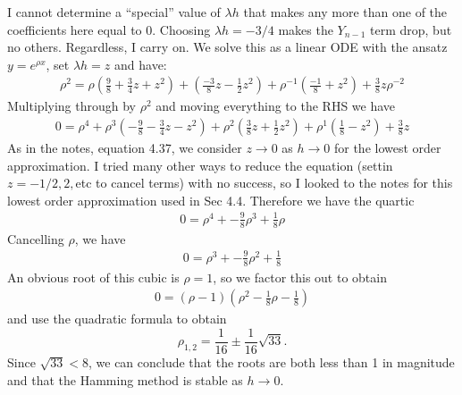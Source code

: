 \documentclass[11pt]{article}
\def\f{\frac }
\begin{document}
\begin{enumerate}
\begin{enumerate}
I cannot determine a ``special'' value of $\lambda h$ that makes any more than one of the coefficients here equal to 0.
Choosing $\lambda h = -3/4$ makes the $Y_{n-1}$ term drop, but no others.
Regardless, I carry on.
We solve this as a linear ODE with the ansatz $y = e^{\rho x}$, set $\lambda h = z$ and have:
\begin{align*} \rho ^2  = \rho \left ( \f{9}{8} + \f{3}{4} z + z ^2 \right ) + \left ( \f{-3}{8} z - \f{1}{2} z^2 \right ) + \rho^{-1} \left ( \f{-1}{8} + z^2\right ) + \f{3}{8} z \rho ^{-2}  \end{align*}
Multiplying through by $\rho ^2$ and moving everything to the RHS we have
\begin{align*} 0 = \rho ^4 + \rho^3 \left ( -\f{9}{8} - \f{3}{4} z - z ^2 \right ) + \rho ^2 \left ( \f{3}{8} z + \f{1}{2} z^2 \right ) + \rho^{1} \left ( \f{1}{8} - z^2\right ) + \f{3}{8} z \end{align*}
As in the notes, equation 4.37, we consider $z \to 0$ as $h\to 0$ for the lowest order approximation.
I tried many other ways to reduce the equation (settin $z = -1/2,2,$etc to cancel terms) with no success, so I looked to the notes for this lowest order approximation used in Sec 4.4.
Therefore we have the quartic
\begin{align*} 0 = \rho ^4 +  -\f{9}{8}\rho^3 + \f{1}{8}\rho \end{align*}
Cancelling $\rho$, we have
\begin{align*} 0 = \rho ^3 +  -\f{9}{8}\rho^2 + \f{1}{8} \end{align*}
An obvious root of this cubic is $\rho = 1$, so we factor this out to obtain
\begin{align*} 0 = (\rho - 1 ) ( \rho ^2 -\f{1}{8}\rho - \f{1}{8}) \end{align*}
and use the quadratic formula to obtain
\[ \rho_{1,2} = \f{1}{16} \pm \f{1}{16} \sqrt{33} .\]
Since $\sqrt{33} < 8$, we can conclude that the roots are both less than 1 in magnitude and that the Hamming method is stable as $h\to 0$.


\end{enumerate}
\end{enumerate}
\end{document}
